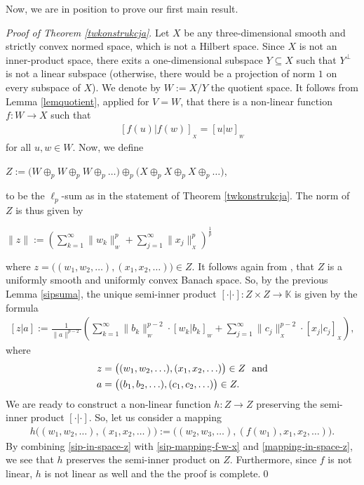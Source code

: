 \documentclass[12pt, reqno]{amsart}
\theoremstyle{definition}
\theoremstyle{remark}
\numberwithin{equation}{section}
\newcommand{\K}{\mbox{$\mathbb{K}$}}
\newcommand{\sip}[2]{\left[#1|#2\right]}
\begin{document}
Now, we  are in position to prove our first main result.

\emph{Proof of Theorem \ref{twkonstrukcja}}.
Let $X$ be any three-dimensional smooth and strictly convex normed space, which is not a Hilbert space. Since $X$ is not an inner-product space, there exits a one-dimensional subspace $Y \subseteq X$ such that $Y^{\bot}$ is not a linear subspace (otherwise, there would be a projection of norm $1$ on every subspace of $X$). We denote by $W:=X/Y$ the quotient space. It follows from Lemma \ref{lemquotient}, applied for $V=W$, that there is a non-linear function $f\colon W\to X$ such that
\begin{align}\label{sip-mapping-f-w-x}
\sip{f(u)}{f(w)}_{_X}=\sip{u}{w}_{_W}
\end{align}
for all $u, w \in W$.
Now, we define
\begin{center}
$Z:=\Big(W\oplus_p W\oplus_p W\oplus_p\ldots\Big)\oplus_p\Big(X\oplus_p X\oplus_p X\oplus_p\ldots\Big)$,
\end{center}
to be the $\ell_p$-sum as in the statement of Theorem \ref{twkonstrukcja}. The norm of $Z$ is thus given by
\begin{center}
$\|z\|:=\left(\sum\limits_{k=1}^\infty \|w_k\|_{_W}^p+\sum\limits_{j=1}^\infty \|x_j\|_{_X}^p\right)^{\frac{1}{p}}$
\end{center}
where $z=\big((w_1,w_2,\ldots),(x_1,x_2,\ldots)\big)\in Z$. It follows again from \cite{zachariades}, that $Z$ is a uniformly smooth and uniformly convex Banach space. So, by the previous Lemma \ref{sipsuma}, the unique semi-inner product $\sip{\cdot}{\cdot}\colon Z\times Z\to\K$ is given by the formula
\begin{align}\label{sip-in-space-z}
\sip{z}{a}:=\frac{1}{\|a\|^{p-2}}\left(\sum\limits_{k=1}^\infty \|b_k\|^{p-2}_{_W}\cdot\sip{w_k}{b_k}_{_W}+\sum\limits_{j=1}^\infty \|c_j\|^{p-2}_{_X}\cdot\sip{x_j}{c_j}_{_X}\right),
\end{align}
where
\begin{align*}
z&=\big((w_1,w_2,\ldots),(x_1,x_2,\ldots)\big)\in Z\ \  {\rm and}\\
a&=\big((b_1,b_2,\ldots),(c_1,c_2,\ldots)\big)\in Z.
\end{align*}
We are ready to construct a non-linear function $h\colon Z\to Z$ preserving the semi-inner product $\sip{\cdot}{\cdot}$. So, let us consider a mapping
\begin{align}\label{mapping-in-space-z}
h\big((w_1,w_2,\ldots),(x_1,x_2,\ldots)\big):=\big((w_2,w_3,\ldots),(f(w_1),x_1,x_2,\ldots)\big).
\end{align}
By combining \eqref{sip-in-space-z} with \eqref{sip-mapping-f-w-x} and \eqref{mapping-in-space-z}, we see that  $h$ preserves the semi-inner product on $Z$. Furthermore, since $f$ is not linear, $h$ is not linear as well and the the proof is complete.\qed
\end{document}
